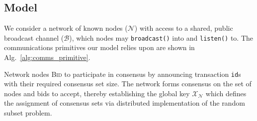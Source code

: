 \documentclass[twocolumn, aps, amsmath, amssymb, nofootinbib, superscriptaddress, longbibliography, floatfix, eqsecnum, rmp]{revtex4-2}
\begin{document}
\subsection{Model}

We consider a network of known nodes ($\mathcal{N}$) with access to a shared, public broadcast channel ($\mathcal{B}$), which nodes may \texttt{broadcast()} into and \texttt{listen()} to. The communications primitives our model relies upon are shown in Alg.~\ref{alg:comms_primitive}.

Network nodes \textsc{Bid} to participate in consensus by announcing transaction \texttt{id}s with their required consensus set size. The network forms consensus on the set of nodes and bids to accept, thereby establishing the global key $\mathcal{X}_\mathcal{N}$ which defines the assignment of consensus sets via distributed implementation of the random subset problem.





%
%
\end{document}
